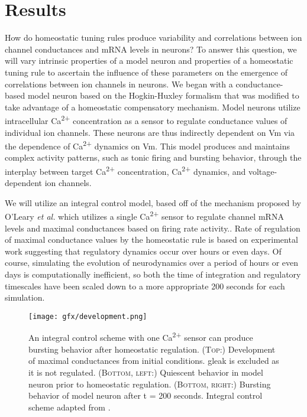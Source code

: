 \chapter{Results}\label{ch:results}

How do homeostatic tuning rules produce variability and correlations between ion channel conductances and mRNA levels in neurons? To answer this question, we will vary intrinsic properties of a model neuron and properties of a homeostatic tuning rule to ascertain the influence of these parameters on the emergence of correlations between ion channels in neurons.
We began with a conductance-based model neuron based on the Hogkin-Huxley formalism that was modified to take advantage of a homeostatic compensatory mechanism. Model neurons utilize intracellular Ca\textsuperscript{2+} concentration as a sensor to regulate conductance values of individual ion channels. These neurons are thus indirectly dependent on \ac{Vm} via the dependence of Ca\textsuperscript{2+} dynamics on \ac{Vm}\cite{oleary_correlations_2013,liu_model_1998}.
This model produces and maintains complex activity patterns, such as tonic firing and bursting behavior, through the interplay between target Ca\textsuperscript{2+} concentration, Ca\textsuperscript{2+} dynamics, and voltage-dependent ion channels.

We will utilize an integral control model, based off of the mechanism proposed by O'Leary \textit{et al.} which utilizes a single Ca\textsuperscript{2+} sensor to regulate channel mRNA levels and maximal conductances based on firing rate activity.\cite{oleary_correlations_2013}.
Rate of regulation of maximal conductance values by the homeostatic rule is based on experimental work suggesting that regulatory dynamics occur over hours or even days\cite{desai_homeostatic_2003,davis_homeostatic_2006,turrigiano_homeostatic_1999}.
Of course, simulating the evolution of neurodynamics over a period of hours or even days is computationally inefficient, so both the time of integration and regulatory timescales have been scaled down to a more appropriate 200 seconds for each simulation.

\begin{figure}[h]
    \centering
    \texttt{[image: gfx/development.png]}
\caption[Development of an integral control model.]{An integral control scheme with one Ca\textsuperscript{2+} sensor can produce bursting behavior after homeostatic regulation. \textsc{(Top:)} Development of maximal conductances from initial conditions. \ac{gleak} is excluded as it is not regulated. (\textsc{Bottom, left:}) Quiescent behavior in model neuron prior to homeostatic regulation. (\textsc{Bottom, right:}) Bursting behavior of model neuron after t = 200 seconds. Integral control scheme adapted from \cite{oleary_correlations_2013}.}
    \label{fig:integraldevelopment}
\end{figure}

